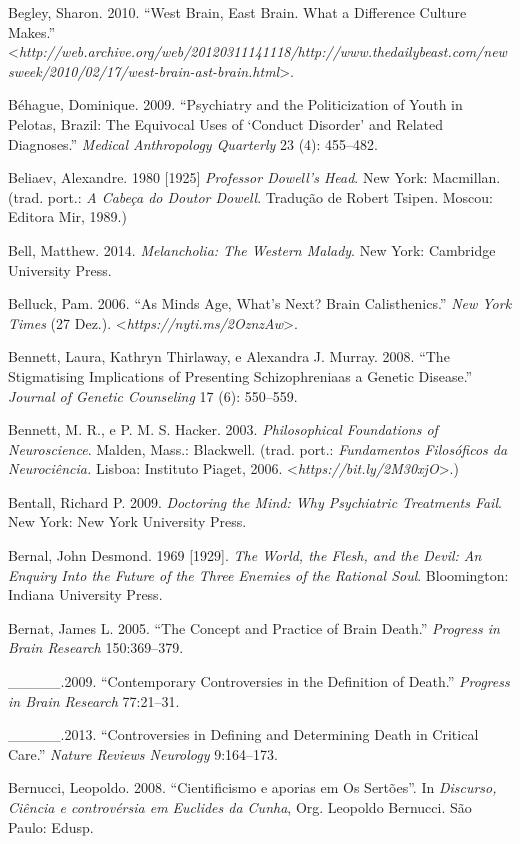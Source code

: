 {\begin{Parskip}
Begley, Sharon. 2010. ``West Brain, East Brain. What a Difference
Culture Makes.''
\textless{}\emph{http://web.archive.org/web/20120311141118/http://www.thedailybeast.com/newsweek/2010/02/17/west-brain-ast-brain.html}\textgreater{}.

Béhague, Dominique. 2009. ``Psychiatry and the Politicization of Youth
in Pelotas, Brazil: The Equivocal Uses of `Conduct Disorder' and Related
Diagnoses.'' \emph{Medical Anthropology Quarterly} 23 (4): 455--482.

Beliaev, Alexandre. 1980 {[}1925{]} \emph{Professor Dowell's Head}. New
York: Macmillan. (trad. port.: \emph{A Cabeça do Doutor Dowell}.
Tradução de Robert Tsipen. Moscou: Editora Mir, 1989.)

Bell, Matthew. 2014. \emph{Melancholia: The Western Malady}. New York:
Cambridge University Press.

Belluck, Pam. 2006. ``As Minds Age, What's Next? Brain Calisthenics.''
\emph{New York Times} (27 Dez.).
\textless{}\emph{https://nyti.ms/2OznzAw}\textgreater{}.

Bennett, Laura, Kathryn Thirlaway, e Alexandra J. Murray. 2008. ``The
Stigmatising Implications of Presenting Schizophreniaas a Genetic
Disease.'' \emph{Journal of Genetic Counseling} 17 (6): 550--559.

Bennett, M. R., e P. M. S. Hacker. 2003. \emph{Philosophical Foundations
of Neuroscience}. Malden, Mass.: Blackwell. (trad. port.:
\emph{Fundamentos Filosóficos da Neurociência.} Lisboa: Instituto
Piaget, 2006.
\textless{}\emph{https://bit.ly/2M30xjO}\textgreater{}.)

Bentall, Richard P. 2009. \emph{Doctoring the Mind: Why Psychiatric
Treatments Fail}. New York: New York University Press.

Bernal, John Desmond. 1969 {[}1929{]}. \emph{The World, the Flesh, and
the Devil: An Enquiry Into the Future of the Three Enemies of the
Rational Soul}. Bloomington: Indiana University Press.

Bernat, James L. 2005. ``The Concept and Practice of Brain Death.''
\emph{Progress in Brain Research} 150:369--379.

\_\_\_\_\_.2009. ``Contemporary Controversies in the Definition of
Death.'' \emph{Progress in Brain Research} 77:21--31.

\_\_\_\_\_.2013. ``Controversies in Defining and Determining Death in
Critical Care.'' \emph{Nature Reviews Neurology} 9:164--173.

Bernucci, Leopoldo. 2008. ``Cientificismo e aporias em Os Sertões''. In
\emph{Discurso, Ciência e controvérsia em Euclides da Cunha}, Org.
Leopoldo Bernucci. São Paulo: Edusp.


\end{Parskip}}
